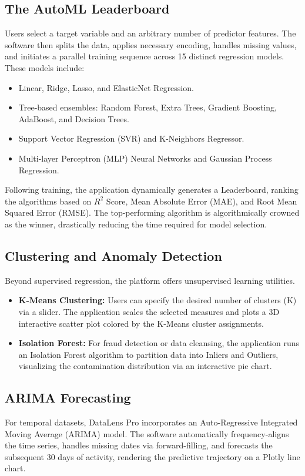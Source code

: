 \documentclass[12pt, a4paper]{article}
\begin{document}
\subsection{The AutoML Leaderboard}
Users select a target variable and an arbitrary number of predictor features. The software then splits the data, applies necessary encoding, handles missing values, and initiates a parallel training sequence across 15 distinct regression models. These models include:
\begin{itemize}
    \item Linear, Ridge, Lasso, and ElasticNet Regression.
    \item Tree-based ensembles: Random Forest, Extra Trees, Gradient Boosting, AdaBoost, and Decision Trees.
    \item Support Vector Regression (SVR) and K-Neighbors Regressor.
    \item Multi-layer Perceptron (MLP) Neural Networks and Gaussian Process Regression.
\end{itemize}
Following training, the application dynamically generates a Leaderboard, ranking the algorithms based on $R^2$ Score, Mean Absolute Error (MAE), and Root Mean Squared Error (RMSE). The top-performing algorithm is algorithmically crowned as the winner, drastically reducing the time required for model selection.
\subsection{Clustering and Anomaly Detection}
Beyond supervised regression, the platform offers unsupervised learning utilities.
\begin{itemize}
    \item \textbf{K-Means Clustering:} Users can specify the desired number of clusters (K) via a slider. The application scales the selected measures and plots a 3D interactive scatter plot colored by the K-Means cluster assignments.
    \item \textbf{Isolation Forest:} For fraud detection or data cleansing, the application runs an Isolation Forest algorithm to partition data into Inliers and Outliers, visualizing the contamination distribution via an interactive pie chart.
\end{itemize}
\subsection{ARIMA Forecasting}
For temporal datasets, DataLens Pro incorporates an Auto-Regressive Integrated Moving Average (ARIMA) model. The software automatically frequency-aligns the time series, handles missing dates via forward-filling, and forecasts the subsequent 30 days of activity, rendering the predictive trajectory on a Plotly line chart.
\end{document}
